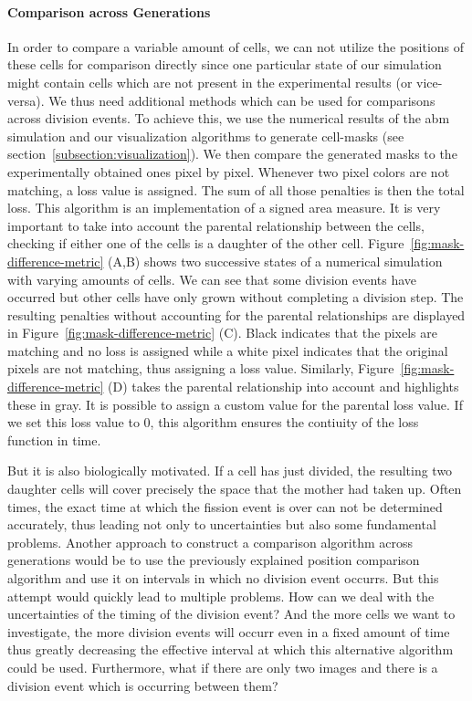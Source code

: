 \documentclass{article}
\begin{document}
\paragraph{Comparison across Generations}
In order to compare a variable amount of cells, we can not utilize the positions of these cells
for comparison directly since one particular state of our simulation might contain cells which are
not present in the experimental results (or vice-versa).
We thus need additional methods which can be used for comparisons across division events.
To achieve this, we use the numerical results of the \ac{abm} simulation and our visualization
algorithms to generate cell-masks (see section~\ref{subsection:visualization}).
We then compare the generated masks to the experimentally obtained ones pixel by pixel.
Whenever two pixel colors are not matching, a loss value is assigned.
The sum of all those penalties is then the total loss.
This algorithm is an implementation of a signed area measure.
It is very important to take into account the parental relationship between the cells, checking if
either one of the cells is a daughter of the other cell.
Figure~\ref{fig:mask-difference-metric} (A,B) shows two successive states of a numerical simulation
with varying amounts of cells.
We can see that some division events have occurred but other cells have only grown without
completing a division step.
The resulting penalties without accounting for the parental relationships are displayed in
Figure~\ref{fig:mask-difference-metric} (C).
Black indicates that the pixels are matching and no loss is assigned while a white pixel
indicates that the original pixels are not matching, thus assigning a loss value.
Similarly, Figure~\ref{fig:mask-difference-metric} (D) takes the parental relationship into account
and highlights these in gray.
It is possible to assign a custom value for the parental loss value.
If we set this loss value to $0$, this algorithm ensures the contiuity of the loss function in time.

But it is also biologically motivated.
If a cell has just divided, the resulting two daughter cells will cover precisely the space that the
mother had taken up.
Often times, the exact time at which the fission event is over can not be determined accurately,
thus leading not only to uncertainties but also some fundamental problems.
Another approach to construct a comparison algorithm across generations would be to use the
previously explained position comparison algorithm and use it on intervals in which no division
event occurrs.
But this attempt would quickly lead to multiple problems.
How can we deal with the uncertainties of the timing of the division event?
And the more cells we want to investigate, the more division events will occurr even in a fixed
amount of time thus greatly decreasing the effective interval at which this alternative algorithm
could be used.
Furthermore, what if there are only two images and there is a division event which is occurring
between them?
\end{document}
